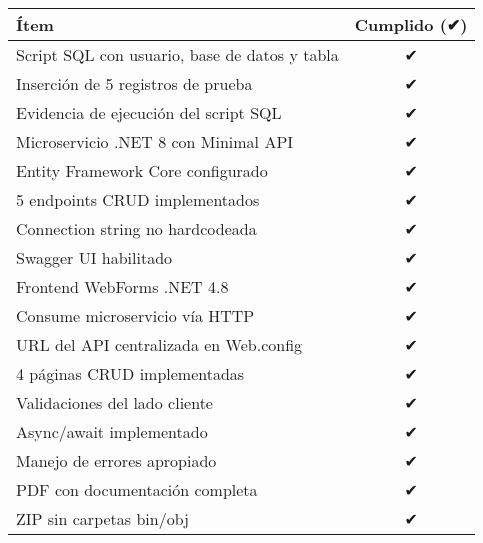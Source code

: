 \documentclass[12pt,a4paper]{report}
\begin{document}
\begin{center}
\begin{tabular}{|p{8cm}|c|}
\hline
\textbf{Ítem} & \textbf{Cumplido (✔︎)} \\
\hline
Script SQL con usuario, base de datos y tabla & ✔ \\
\hline
Inserción de 5 registros de prueba & ✔ \\
\hline
Evidencia de ejecución del script SQL & ✔ \\
\hline
Microservicio .NET 8 con Minimal API & ✔ \\
\hline
Entity Framework Core configurado & ✔ \\
\hline
5 endpoints CRUD implementados & ✔ \\
\hline
Connection string no hardcodeada & ✔ \\
\hline
Swagger UI habilitado & ✔ \\
\hline
Frontend WebForms .NET 4.8 & ✔ \\
\hline
Consume microservicio vía HTTP & ✔ \\
\hline
URL del API centralizada en Web.config & ✔ \\
\hline
4 páginas CRUD implementadas & ✔ \\
\hline
Validaciones del lado cliente & ✔ \\
\hline
Async/await implementado & ✔ \\
\hline
Manejo de errores apropiado & ✔ \\
\hline
PDF con documentación completa & ✔ \\
\hline
ZIP sin carpetas bin/obj & ✔ \\
\hline
\end{tabular}
\end{center}

\vspace{2cm}

\begin{center}
\end{center}
\end{document}
